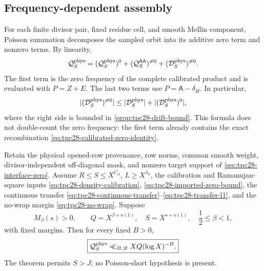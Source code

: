 \subsection{Frequency-dependent assembly}

For each finite divisor pair, fixed residue cell, and smooth Mellin
component, Poisson summation decomposes the sampled orbit into its
additive zero term and nonzero terms.  By linearity,
\begin{equation}
 \mathcal Q_S^{\rm phys}
 =(\mathcal Q_S^{\rm phys})^0
 +(\mathcal Q_S^{\mathsf A\mathsf A})^{\ne0}
 +(\mathcal D_S^{\rm phys})^{\ne0}.
 \label{eq:tpc28-frequency-dependent-assembly}
\end{equation}
The first term is the zero frequency of the complete calibrated
product and is evaluated with $P=Z+E$.  The last two terms use
$P=\mathsf A-\delta_H$.  In particular,
\begin{equation}
 |(\mathcal D_S^{\rm phys})^{\ne0}|
 \le|\mathcal D_S^{\rm phys}|+|(\mathcal D_S^{\rm phys})^0|,
 \label{eq:tpc28-drift-nonzero-majorant}
\end{equation}
where the right side is bounded in
\cref{prop:tpc28-drift-bound}.  This formula does not double-count the
zero frequency: the first term already contains the exact
recombination \eqref{eq:tpc28-calibrated-zero-identity}.

\begin{theorem}
\label{thm:tpc28-base-closure}
Retain the physical opened-row provenance, row norms, common smooth
weight, divisor-independent off-diagonal mask, and nonzero target
support of \cref{sec:tpc28-interface-zero}.  Assume
$R\le S\le X^{C_S}$, $L\ge X^{\lambda_0}$, the calibration and
Ramanujan-square inputs
\eqref{eq:tpc28-density-calibration}, \eqref{eq:tpc28-imported-zero-bound},
the continuous transfer
\eqref{eq:tpc28-continuous-transfer}--\eqref{eq:tpc28-transfer-l1},
and the no-wrap margin \eqref{eq:tpc28-no-wrap}.  Suppose
\begin{equation}
 M_\beta(s)>0,
 \qquad Q=X^{\beta+o(1)},\quad S=X^{s+o(1)},\quad
 \frac12\le\beta<1,
 \label{eq:tpc28-base-theorem-hypotheses}
\end{equation}
with fixed margins.  Then for every fixed $B>0$,
\begin{equation}
 \boxed{
 \mathcal Q_S^{\rm phys}
 \ll_{B,\mathscr D}XQ(\log X)^{-B}.}
 \label{eq:tpc28-base-closure}
\end{equation}
The theorem permits $S>J$; no Poisson-short hypothesis is present.
\end{theorem}

